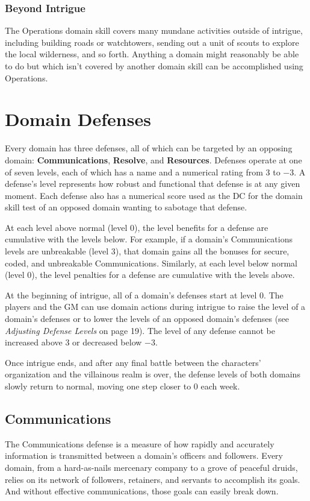 \documentclass[10pt,a4paper,twoside,bg=print,twocolumn,openany,nodeprecatedcode]{dndbook}
\begin{document}
\subsubsection{Beyond Intrigue}
The Operations domain skill covers many mundane activities outside of intrigue, including building roads or watchtowers, sending out a unit of scouts to explore the local wilderness, and so forth. Anything a domain might reasonably be able to do but which isn't covered by another domain skill can be accomplished using Operations.

\section{Domain Defenses}
Every domain has three defenses, all of which can be targeted by an opposing domain: \textbf{Communications}, \textbf{Resolve}, and \textbf{Resources}. Defenses operate at one of seven levels, each of which has a name and a numerical rating from 3 to −3. A defense's level represents how robust and functional that defense is at any given moment. Each defense also has a numerical score used as the DC for the domain skill test of an opposed domain wanting to sabotage that defense.

At each level above normal (level 0), the level benefits for a defense are cumulative with the levels below. For example, if a domain's Communications levels are unbreakable (level 3), that domain gains all the bonuses for secure, coded, and unbreakable Communications. Similarly, at each level below normal (level 0), the level penalties for a defense are cumulative with the levels above.

At the beginning of intrigue, all of a domain's defenses start at level 0. The players and the GM can use domain actions during intrigue to raise the level of a domain's defenses or to lower the levels of an opposed domain's defenses (see \textit{Adjusting Defense Levels} on page 19). The level of any defense cannot be increased above 3 or decreased below −3.

Once intrigue ends, and after any final battle between the characters' organization and the villainous realm is over, the defense levels of both domains slowly return to normal, moving one step closer to 0 each week.

\subsection{Communications}
The Communications defense is a measure of how rapidly and accurately information is transmitted between a domain's officers and followers. Every domain, from a hard-as-nails mercenary company to a grove of peaceful druids, relies on its network of followers, retainers, and servants to accomplish its goals. And without effective communications, those goals can easily break down.
\end{document}
